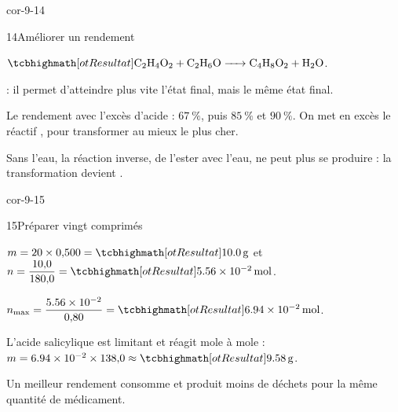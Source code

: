 \begin{blocLivre}{cor-9-14}
\begin{corrige}{14}{Améliorer un rendement}
\begin{questions}
\item $\res{\ce{C2H4O2 + C2H6O -> C4H8O2 + H2O}}$.
\item {} : il permet d'atteindre plus vite l'état final, mais le même état final.
\item Le rendement  avec l'excès d'acide : $\qty{67}{\percent}$, puis $\qty{85}{\percent}$ et $\qty{90}{\percent}$. On met en excès le réactif
, pour transformer au mieux le plus cher.
\item Sans l'eau, la réaction inverse, de l'ester avec l'eau, ne peut plus se produire : la transformation devient
.
\end{questions}
\end{corrige}
\end{blocLivre}
\begin{blocLivre}{cor-9-15}
\begin{corrige}{15}{Préparer vingt comprimés}
\begin{questions}
\item $m=20\times0{,}500=\res{\qty{10,0}{g}}$ et $n=\dfrac{10{,}0}{180{,}0}=\res{\qty{5,56e-2}{mol}}$.
\item $n_\text{max}=\dfrac{\num{5.56e-2}}{0{,}80}=\res{\qty{6,94e-2}{mol}}$.
\item L'acide salicylique est limitant et réagit mole à mole : $m=\num{6.94e-2}\times138{,}0\approx\res{\qty{9,58}{g}}$.
\item Un meilleur rendement consomme  et produit moins de déchets pour la même quantité de médicament.
\end{questions}
\end{corrige}
\end{blocLivre}
